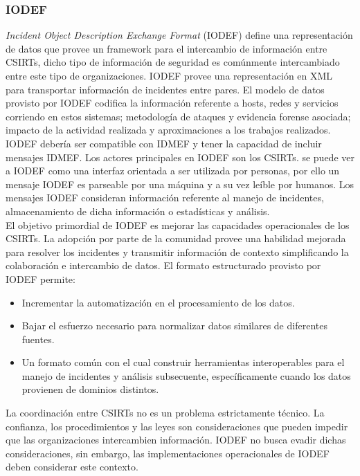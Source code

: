 \subsubsection{IODEF}

\textit{Incident Object Description Exchange Format} (IODEF) define una representación de datos que provee un framework para el 
intercambio de información entre CSIRTs, dicho tipo de información de seguridad 
es comúnmente intercambiado entre este tipo de organizaciones. IODEF provee una 
representación en XML para transportar información de incidentes entre pares. El modelo de datos provisto por IODEF codifica la información 
referente a hosts, redes y servicios corriendo en estos sistemas; metodología 
de ataques y evidencia forense asociada; impacto de la actividad realizada y
aproximaciones a los trabajos realizados.\\

IODEF debería ser compatible con IDMEF y tener la capacidad de incluir mensajes 
IDMEF. Los actores principales en IODEF son los CSIRTs. se puede ver a IODEF como una interfaz orientada a ser utilizada por 
personas, por ello un mensaje IODEF es parseable por una máquina y a su vez 
leíble por humanos. Los mensajes IODEF consideran 
información referente al manejo de incidentes, almacenamiento de dicha 
información o estadísticas y análisis.\\

El objetivo primordial de IODEF es mejorar las capacidades operacionales de los 
CSIRTs. La adopción por parte de la comunidad provee una habilidad mejorada para 
resolver los incidentes y transmitir información de contexto simplificando la 
colaboración e intercambio de datos.
El formato estructurado provisto por IODEF permite:
\begin{itemize}
  \item Incrementar la automatización en el procesamiento de los datos.
  \item Bajar el esfuerzo necesario para normalizar datos similares de 
  diferentes fuentes.
  \item Un formato común con el cual construir herramientas interoperables para 
  el manejo de incidentes y análisis subsecuente, específicamente cuando 
  los datos provienen de dominios distintos.
\end{itemize}

La coordinación entre CSIRTs no es un problema estrictamente técnico. La 
confianza, los procedimientos y las leyes son consideraciones que pueden impedir 
que las organizaciones intercambien información. IODEF no busca evadir dichas 
consideraciones, sin embargo, las implementaciones operacionales de IODEF deben 
considerar este contexto.